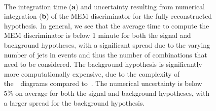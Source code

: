 \begin{figure}
\begin{centering}
\\
\caption[The MEM integration time.]{The integration time (\textbf{a}) and uncertainty resulting from numerical integration (\textbf{b}) of the MEM discriminator for the fully reconstructed hypothesis. In general, we see that the average time to compute the MEM discriminator is below 1 minute for both the signal and background hypotheses, with a significant spread due to the varying number of jets in events and thus the number of combinations that need to be considered. The background hypothesis is significantly more computationally expensive, due to the complexity of the~\ttbb~diagrams compared to~\ttHbb. The numerical uncertainty is below~$5\%$ on average for both the signal and background hypotheses, with a larger spread for the background hypothesis.}
\label{fig:mem_numerical_accuracy}
\end{centering}
\end{figure}

